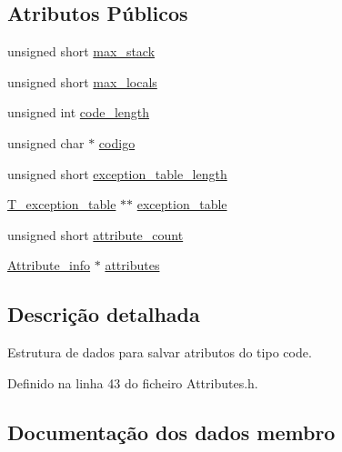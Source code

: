 \subsection*{Atributos Públicos}
\begin{DoxyCompactItemize}
\item 
unsigned short \hyperlink{structCode__attribute_a79788dd1a87f20447908885db5eeb43e}{max\+\_\+stack}
\item 
unsigned short \hyperlink{structCode__attribute_a5c78e8e2f4557c3f95ef4ce844e4c34f}{max\+\_\+locals}
\item 
unsigned int \hyperlink{structCode__attribute_a2e5718559f43a06fcdea23b2bb289c5b}{code\+\_\+length}
\item 
unsigned char $\ast$ \hyperlink{structCode__attribute_a7ca728e51c5888fc4a95ec8b14bcab59}{codigo}
\item 
unsigned short \hyperlink{structCode__attribute_ab29373557f9cfffb736fe8d275884c70}{exception\+\_\+table\+\_\+length}
\item 
\hyperlink{structT__exception__table}{T\+\_\+exception\+\_\+table} $\ast$$\ast$ \hyperlink{structCode__attribute_a21aaa6b7c7e11176c026c57f78046e05}{exception\+\_\+table}
\item 
unsigned short \hyperlink{structCode__attribute_a13e6fb9304168a15c4caf3f37d1006e3}{attribute\+\_\+count}
\item 
\hyperlink{structAttribute__info}{Attribute\+\_\+info} $\ast$ \hyperlink{structCode__attribute_ad42c1c926ade7cce485bed5e59184049}{attributes}
\end{DoxyCompactItemize}


\subsection{Descrição detalhada}
Estrutura de dados para salvar atributos do tipo code. 

Definido na linha 43 do ficheiro Attributes.\+h.



\subsection{Documentação dos dados membro}
\mbox{\label{structCode__attribute_a13e6fb9304168a15c4caf3f37d1006e3}} 
